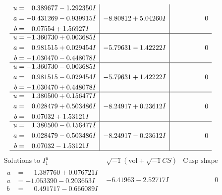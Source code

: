 \documentclass[1p]{elsarticle_modified}
\theoremstyle{definition}
\newcommand{\I}{\sqrt{-1}}
\begin{document}
$$\begin{array}{c|c|c}
\begin{aligned}
u &= \phantom{-}0.389677 - 1.292350 I \\
a &= -0.431269 - 0.939915 I \\
b &= \phantom{-}0.07554 + 1.56927 I\end{aligned}
 & -8.80812 + 5.04260 I & \phantom{-0.000000 } 0 \\ \hline\begin{aligned}
u &= -1.360730 + 0.003685 I \\
a &= \phantom{-}0.981515 + 0.029454 I \\
b &= -1.030470 - 0.448078 I\end{aligned}
 & -5.79631 - 1.42222 I & \phantom{-0.000000 } 0 \\ \hline\begin{aligned}
u &= -1.360730 - 0.003685 I \\
a &= \phantom{-}0.981515 - 0.029454 I \\
b &= -1.030470 + 0.448078 I\end{aligned}
 & -5.79631 + 1.42222 I & \phantom{-0.000000 } 0 \\ \hline\begin{aligned}
u &= \phantom{-}1.380500 + 0.156477 I \\
a &= \phantom{-}0.028479 + 0.503486 I \\
b &= \phantom{-}0.07032 + 1.53121 I\end{aligned}
 & -8.24917 + 0.23612 I & \phantom{-0.000000 } 0 \\ \hline\begin{aligned}
u &= \phantom{-}1.380500 - 0.156477 I \\
a &= \phantom{-}0.028479 - 0.503486 I \\
b &= \phantom{-}0.07032 - 1.53121 I\end{aligned}
 & -8.24917 - 0.23612 I & \phantom{-0.000000 } 0\\
 \hline 
 \end{array}$$\newpage$$\begin{array}{c|c|c}  
\text{Solutions to }I^u_{1}& \I (\text{vol} + \sqrt{-1}CS) & \text{Cusp shape}\\
 \hline 
\begin{aligned}
u &= \phantom{-}1.387760 + 0.076721 I \\
a &= -1.053390 - 0.203653 I \\
b &= \phantom{-}0.491717 - 0.666089 I\end{aligned}
 & -6.41963 - 2.52717 I & \phantom{-0.000000 } 0 \\ \hline\begin{aligned}

\end{aligned}
\end{array}$$
\end{document}

